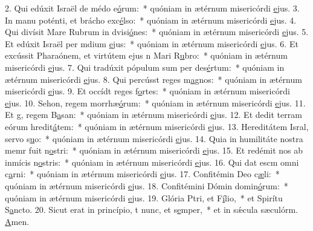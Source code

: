 2. Qui edúxit Israël de médo e\uline{ó}rum:~* quóniam in ætérnum misericórdi \uline{e}jus.
3. In manu poténti, et brácho exc\uline{é}lso:~* quóniam in ætérnum misericórdi \uline{e}jus.
4. Qui divísit Mare Rubrum in dvisi\uline{ó}nes:~* quóniam in ætérnum misericórdi \uline{e}jus.
5. Et edúxit Israël per mdium \uline{e}jus:~* quóniam in ætérnum misericórdi \uline{e}jus.
6. Et excússit Pharaónem, et virtútem ejus n Mari R\uline{u}bro:~* quóniam in ætérnum misericórdi \uline{e}jus.
7. Qui tradúxit pópulum sum per des\uline{é}rtum:~* quóniam in ætérnum misericórdi \uline{e}jus.
8. Qui percússt reges m\uline{a}gnos:~* quóniam in ætérnum misericórdi \uline{e}jus.
9. Et occídt reges f\uline{o}rtes:~* quóniam in ætérnum misericórdi \uline{e}jus.
10. Sehon, regem morrhæ\uline{ó}rum:~* quóniam in ætérnum misericórdi \uline{e}jus.
11. Et g, regem B\uline{a}san:~* quóniam in ætérnum misericórdi \uline{e}jus.
12. Et dedit terram eórum hredit\uline{á}tem:~* quóniam in ætérnum misericórdi \uline{e}jus.
13. Hereditátem Isral, servo s\uline{u}o:~* quóniam in ætérnum misericórdi \uline{e}jus.
14. Quia in humilitáte nostra memr fuit n\uline{o}stri:~* quóniam in ætérnum misericórdi \uline{e}jus.
15. Et redémit nos ab inmícis n\uline{o}stris:~* quóniam in ætérnum misericórdi \uline{e}jus.
16. Qui dat escm omni c\uline{a}rni:~* quóniam in ætérnum misericórdi \uline{e}jus.
17. Confitémin Deo c\uline{æ}li:~* quóniam in ætérnum misericórdi \uline{e}jus.
18. Confitémini Dómin domin\uline{ó}rum:~* quóniam in ætérnum misericórdi \uline{e}jus.
19. Glória Ptri, et F\uline{í}lio,~* et Spirítu S\uline{a}ncto.
20. Sicut erat in princípio, t nunc, et s\uline{e}mper,~* et in sǽcula sæculórm. \uline{A}men.
